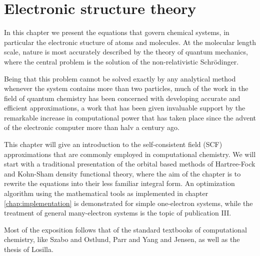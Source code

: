\chapter{Electronic structure theory}
In this chapter we present the equations that govern chemical systems, in particular
the electronic stucture of atoms and molecules. At the molecular length scale, nature
is most accurately described by the theory of quantum mechanics, where the central
problem is the solution of the non-relativistic Schr\"{o}dinger.

Being that this problem cannot be solved exactly by any analytical method whenever
the system contains more than two particles, much of the work in the field of quantum
chemistry has been concerned with developing accurate and efficient approximations,
a work that has been given invaluable support by the remarkable increase in 
computational power that has taken place since the advent of the electronic computer 
more than halv a century ago.

This chapter will give an introduction to the self-consistent field (SCF) approximations 
that are commonly employed in computational chemistry. We will start with a traditional 
presentation of the orbital based methods of Hartree-Fock and Kohn-Sham density functional 
theory, where the aim of the chapter is to rewrite the equations into their less familiar 
integral form. An optimization algorithm using the mathematical tools as implemented in 
chapter \ref{chap:implementation} is demonstrated for simple one-electron systems, while 
the treatment of general many-electron systems is the topic of publication III.

Most of the exposition follows that of the standard textbooks of computational chemistry, 
like Szabo and Ostlund\cite{Szabo-Ostlund:1982}, Parr and Yang\cite{Parr-Yang:1989} and 
Jensen\cite{Jensen:2007}, as well as the thesis of Losilla\cite{Losilla_thesis:2013}.

